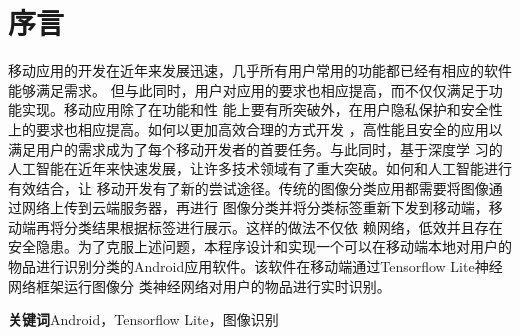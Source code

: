 %
%
%
%

\section{序言}

移动应用的开发在近年来发展迅速，几乎所有用户常用的功能都已经有相应的软件能够满足需求。
但与此同时，用户对应用的要求也相应提高，而不仅仅满足于功能实现。移动应用除了在功能和性
能上要有所突破外，在用户隐私保护和安全性上的要求也相应提高。如何以更加高效合理的方式开发
，高性能且安全的应用以满足用户的需求成为了每个移动开发者的首要任务。与此同时，基于深度学
习的人工智能在近年来快速发展，让许多技术领域有了重大突破。如何和人工智能进行有效结合，让
移动开发有了新的尝试途径。传统的图像分类应用都需要将图像通过网络上传到云端服务器，再进行
图像分类并将分类标签重新下发到移动端，移动端再将分类结果根据标签进行展示。这样的做法不仅依
赖网络，低效并且存在安全隐患。为了克服上述问题，本程序设计和实现一个可以在移动端本地对用户的
物品进行识别分类的Android应用软件。该软件在移动端通过Tensorflow Lite神经网络框架运行图像分
类神经网络对用户的物品进行实时识别。

\textbf{关键词}\hspace{1em}Android，Tensorflow Lite，图像识别